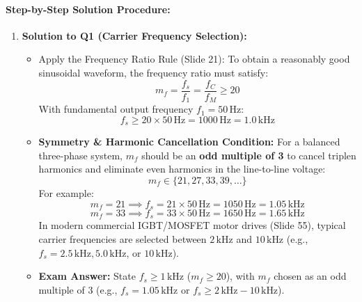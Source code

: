 \paragraph{Step-by-Step Solution Procedure:}
\begin{enumerate}
  \item \textbf{Solution to Q1 (Carrier Frequency Selection):}
  \begin{itemize}
    \item Apply the Frequency Ratio Rule (Slide 21): To obtain a reasonably good sinusoidal waveform, the frequency ratio must satisfy:
    \[
    m_f = \frac{f_s}{f_1} = \frac{f_C}{f_M} \ge 20
    \]
    With fundamental output frequency $f_1 = 50\,\si{\hertz}$:
    \[
    f_s \ge 20 \times 50\,\si{\hertz} = 1000\,\si{\hertz} = 1.0\,\si{\kilo\hertz}
    \]
    \item \textbf{Symmetry \& Harmonic Cancellation Condition:} For a balanced three-phase system, $m_f$ should be an \textbf{odd multiple of 3} to cancel triplen harmonics and eliminate even harmonics in the line-to-line voltage:
    \[
    m_f \in \{21, 27, 33, 39, \dots\}
    \]
    For example:
    \[
    m_f = 21 \implies f_s = 21 \times 50\,\si{\hertz} = 1050\,\si{\hertz} = 1.05\,\si{\kilo\hertz}
    \]
    \[
    m_f = 33 \implies f_s = 33 \times 50\,\si{\hertz} = 1650\,\si{\hertz} = 1.65\,\si{\kilo\hertz}
    \]
    In modern commercial IGBT/MOSFET motor drives (Slide 55), typical carrier frequencies are selected between $2\,\si{\kilo\hertz}$ and $10\,\si{\kilo\hertz}$ (e.g., $f_s = 2.5\,\si{\kilo\hertz}, 5.0\,\si{\kilo\hertz}$, or $10\,\si{\kilo\hertz}$).
    \item \textbf{Exam Answer:} State $f_s \ge 1\,\si{\kilo\hertz}$ ($m_f \ge 20$), with $m_f$ chosen as an odd multiple of 3 (e.g., $f_s = 1.05\,\si{\kilo\hertz}$ or $f_s \ge 2\,\si{\kilo\hertz}-10\,\si{\kilo\hertz}$).
  \end{itemize}


\end{enumerate}

